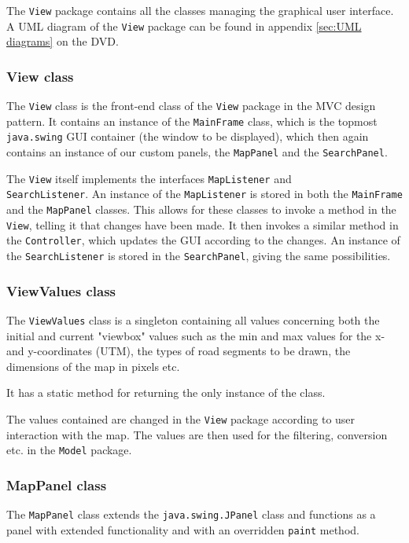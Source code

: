 The \texttt{View} package contains all the classes managing the graphical user interface.  A UML diagram of the \texttt{View} package can be found in appendix \ref{sec:UML diagrams} on the DVD.


\subsubsection{View class} %
The \texttt{View} class is the front-end class of the \texttt{View} package in the MVC design pattern. It contains an instance of the \texttt{MainFrame} class, which is the topmost \texttt{java.swing} GUI container (the window to be displayed), which then again contains an instance of our custom panels, the \texttt{MapPanel} and the \texttt{SearchPanel}.

The \texttt{View} itself implements the interfaces \texttt{MapListener} and \\ \texttt{SearchListener}. An instance of the \texttt{MapListener} is stored in both the \texttt{MainFrame} and the \texttt{MapPanel} classes. This allows for these classes to invoke a method in the \texttt{View}, telling it that changes have been made. It then invokes a similar method in the \texttt{Controller}, which updates the GUI according to the changes. An instance of the \texttt{SearchListener} is stored in the \texttt{SearchPanel}, giving the same possibilities.

\subsubsection{ViewValues class}
The \texttt{ViewValues} class is a singleton containing all values concerning both the initial and current "viewbox" values such as the min and max values for the x- and y-coordinates (UTM), the types of road segments to be drawn, the dimensions of the map in pixels etc.

It has a static method for returning the only instance of the class.

The values contained are changed in the \texttt{View} package according to user interaction with the map. The values are then used for the filtering, conversion etc. in the \texttt{Model} package.

\subsubsection{MapPanel class} %
The \texttt{MapPanel} class extends the \texttt{java.swing.JPanel} class and functions as a panel with extended functionality and with an overridden \texttt{paint} method.


